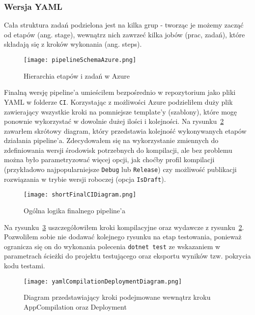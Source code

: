 \subsubsection{Wersja YAML}
Cała struktura zadań podzielona jest na kilka grup - tworząc je możemy zacząć od etapów (ang. stage), 
wewnątrz nich zawrzeć kilka jobów (prac, zadań), które składają się z kroków wykonania (ang. steps).

\begin{figure}[ht]
    \centering
    \texttt{[image: pipelineSchemaAzure.png]}
    \caption{Hierarchia etapów i zadań w Azure~\cite{pipelineSchemaAzure_source}}
    \label{img:pipelineSchemaAzure}
\end{figure}
Finalną wersję pipeline'a umieściłem bezpośrednio w repozytorium jako pliki YAML w folderze \verb|CI|.
Korzystając z możliwości Azure podzieliłem duży plik zawierający wszystkie kroki 
na pomniejsze template'y (szablony), które mogę ponownie wykorzystać w dowolnie dużej 
ilości i kolejności.
Na rysunku~\ref{img:shortFinalCIDiagram} zawarłem skrótowy diagram, który 
przedstawia kolejność wykonywanych etapów działania pipeline'a. 
Zdecydowałem się na wykorzystanie zmiennych do zdefiniowania wersji środowisk potrzebnych 
do kompilacji, ale bez problemu można było parametryzować więcej opcji, jak choćby 
profil kompilacji (przykładowo najpopularniejsze \verb|Debug| lub \verb|Release|) czy 
możliwość publikacji rozwiązania w trybie wersji roboczej (opcja \verb|IsDraft|).

\begin{figure}[hb]
    \centering
    \texttt{[image: shortFinalCIDiagram.png]}
    \caption{Ogólna logika finalnego pipeline'a}
    \label{img:shortFinalCIDiagram}
\end{figure}

Na rysunku~\ref{img:yamlCompilationDeploymentDiagram} uszczegółowiłem kroki kompilacyjne 
oraz wydawcze z rysunku~\ref{img:shortFinalCIDiagram}. Pozwoliłem sobie nie dodawać kolejnego 
rysunku na etap testowania, ponieważ ogranicza się on do wykonania polecenia \verb|dotnet test|
ze wskazaniem w parametrach ścieżki do projektu testującego 
oraz eksportu wyników tzw. pokrycia kodu testami.

\begin{figure}[ht]
    \centering
    \texttt{[image: yamlCompilationDeploymentDiagram.png]}
    \caption{Diagram przedstawiający kroki podejmowane wewnątrz kroku AppCompilation oraz Deployment}
    \label{img:yamlCompilationDeploymentDiagram}
\end{figure}

